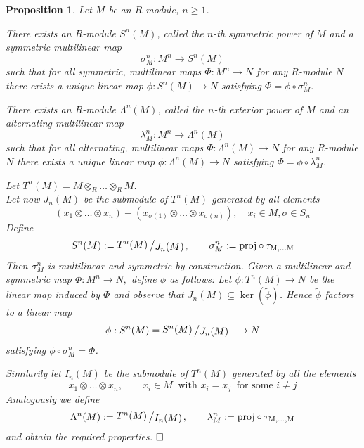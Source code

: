 \documentclass[11pt]{book}
\newtheorem{proposition}[theorem]{Proposition}
\theoremstyle{nonumberbreak}
\newenvironment{pr}[1][]{\ifthenelse{\equal{#1}{}}{\proof}{\proof[#1]}\rm}{\endproof}
\newcommand{\slant}[2]{{\raisebox{.1em}{$#1$}\left/\raisebox{-.1em}{$#2$}\right.}}
\begin{document}
\begin{spacing}{1.3}
\begin{proposition} %
Let $M$ be an $R$-module, $n \geqslant 1$. 
\begin{compactenum}
\item There exists an $R$-module $S^n(M)$, called the $n$\textit{-th symmetric power} of $M$ and a symmetric multilinear map
$$\sigma_M^n:M^n \longrightarrow S^n(M)$$
such that for all symmetric, multilinear maps $\Phi: M^n \longrightarrow N$ for any $R$-module $N$ there exists a unique linear map
$\phi:S^n(M) \longrightarrow N$ satisfying $\Phi = \phi \circ \sigma_M^n.$
\item There exists an $R$-module $\Lambda^n(M)$, called the $n$-\textit{th exterior power} of $M$ and an alternating multilinear map 
$$\lambda_M^n: M^n \longrightarrow \Lambda^n(M)$$
such that for all alternating, multilinear maps $\Phi: \Lambda^n(M) \longrightarrow N$ for any $R$-module $N$ there exists a unique linear map 
$\phi:\Lambda^n(M) \longrightarrow N$ satisfying $\Phi=\phi \circ \lambda_M^n$.
\end{compactenum}
\begin{pr}
\begin{compactenum}
\item Let $T^n(M)=M \otimes_R \ldots \otimes_R M$.\\
Let now $J_n(M)$ be the submodule of $T^n(M)$ generated by all elements
$$\left(x_1 \otimes \ldots \otimes x_n\right)-\left(x_{\sigma(1)} \otimes \ldots \otimes x_{\sigma(n)}\right), \quad x_i \in M, \sigma \in S_n$$
Define $$S^n(M):=\slant{T^n(M)}{J_n(M)}, \qquad \sigma_M^n := \rm{proj} \circ \tau_{M,\ldots M}$$
Then $\sigma_M^n$ is multilinear and symmetric by construction. Given a multilinear and symmetric map
$\Phi: M^n \longrightarrow N,$
define $\phi$ as follows: Let $\tilde{\phi}:T^n(M) \longrightarrow N$ be the linear map induced by $\Phi$ and observe that $J_n(M) \subseteq \ker(\tilde{\phi})$. Hence $\tilde{\phi}$ factors to a linear map 
$$\phi: S^n(M)=\slant{S^n(M)}{J_n(M)} \longrightarrow N$$
satisfying $\phi \circ \sigma_M^n=\Phi$. 
\item Similarily let $I_n(M)$ be the submodule of $T^n(M)$ generated by all the elements
$$x_1 \otimes \ldots \otimes x_n, \qquad x_i \in M \ \textrm{ with } x_i =x_j \ \textrm{ for some }i \neq j$$
Analogously we define 
$$\Lambda^n(M):=\slant{T^n(M)}{I_n(M)}, \qquad \lambda_M^n:= \rm{proj} \circ \tau_{M, \ldots, M}$$
and obtain the required properties. $\hfill \Box$
\end{compactenum}
\end{pr}
\end{proposition}




\end{spacing}
\end{document}
